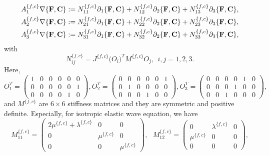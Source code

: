\begin{align*} 
	A_1^{\{f,c\}}\nabla\{{\bf F}, {\bf C}\} &:= N_{11}^{\{f,c\}}\partial_1\{{\bf F}, {\bf C}\} + N_{12}^{\{f,c\}}\partial_2\{{\bf F}, {\bf C}\} + N_{13}^{\{f,c\}}\partial_3\{{\bf F}, {\bf C}\}, \\
	A_2^{\{f,c\}}\nabla\{{\bf F}, {\bf C}\} &:= N_{21}^{\{f,c\}}\partial_1\{{\bf F}, {\bf C}\} + N_{22}^{\{f,c\}}\partial_2\{{\bf F}, {\bf C}\} + N_{23}^{\{f,c\}}\partial_3\{{\bf F}, {\bf C}\}, \\
	A_3^{\{f,c\}}\nabla\{{\bf F}, {\bf C}\} &:= N_{31}^{\{f,c\}}\partial_1\{{\bf F}, {\bf C}\} + N_{32}^{\{f,c\}}\partial_2\{{\bf F}, {\bf C}\} + N_{33}^{\{f,c\}}\partial_3\{{\bf F}, {\bf C}\},
\end{align*}
with
\begin{equation}\label{N_definition}
	N_{ij}^{\{f,c\}} = J^{\{f,c\}}\big(O_i\big)^TM^{\{f,c\}}O_j, \ \ i,j = 1,2,3.
\end{equation}
Here, 
\[ O_{1}^T = \left(\begin{array}{cccccc}
1 & 0 & 0 &0 & 0 & 0\\
0 & 0 & 0 &0 & 0 & 1\\
0 & 0 & 0 &0 & 1 & 0\end{array}\right),  O_{2}^T = \left(\begin{array}{cccccc}
0 & 0 & 0 &0 & 0 & 1\\
0 & 1 & 0 &0 & 0 & 0\\
0 & 0 & 0 &1 & 0 & 0\end{array}\right),  O_{3}^T = \left(\begin{array}{cccccc}
0 & 0 & 0 &0 & 1 & 0\\
0 & 0 & 0 &1 & 0 & 0\\
0 & 0 & 1 &0 & 0 & 0\end{array}\right),\]
and $M^{\{f,c\}}$ are $6\times 6$ stiffness matrices and they are symmetric and positive definite. Especially, for isotropic elastic wave equation, we have
\[ M_{11}^{\{f,c\}} = \left(\begin{array}{ccc}
2\mu^{\{f,c\}}+\lambda^{\{f,c\}} & 0 & 0\\
0 & \mu^{\{f,c\}} & 0\\
0 & 0 & \mu^{\{f,c\}}\end{array}\right),\ \ \  M_{12}^{\{f,c\}} = \left(\begin{array}{ccc}
0 & \lambda^{\{f,c\}} & 0\\
\mu^{\{f,c\}} & 0 & 0\\
0 & 0 & 0\end{array}\right), \]
